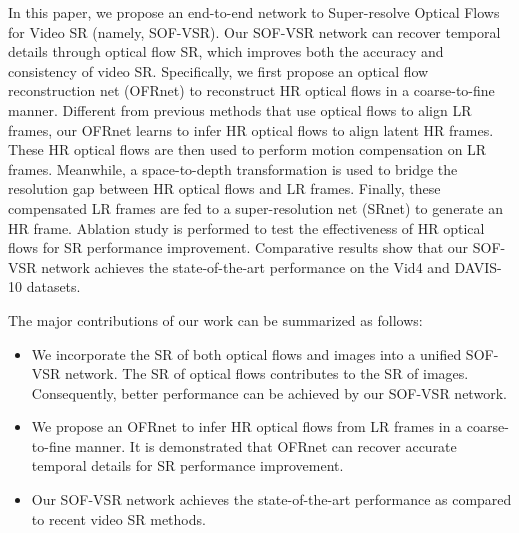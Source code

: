 \documentclass[journal]{IEEEtran}
\begin{document}
	In this paper, we propose an end-to-end network to Super-resolve Optical Flows for Video SR (namely, SOF-VSR). Our SOF-VSR network can recover temporal details through optical flow SR, which improves both the accuracy and consistency of video SR. Specifically, we first propose an optical flow reconstruction net (OFRnet) to reconstruct HR optical flows in a coarse-to-fine manner. Different from previous methods \cite{2015-VideoSuperResolutionViaDeepDraftEnsembleLearning-Liao-531-539,2017-RealTimeVideoSuperResolutionwithSpatioTemporalNetworksandMotionCompensation-Caballero-2848-2857,2017-DetailRevealingDeepVideoSuperResolution-Tao-4482-4490} that use optical flows to align LR frames, our OFRnet learns to infer HR optical flows to align latent HR frames. These HR optical flows are then used to perform motion compensation on LR frames. Meanwhile, a space-to-depth transformation is used to bridge the resolution gap between HR optical flows and LR frames.  Finally, these compensated LR frames are fed to a super-resolution net (SRnet) to generate an HR frame. Ablation study is performed to test the effectiveness of HR optical flows for SR performance improvement. Comparative results show that our SOF-VSR network achieves the state-of-the-art performance on the Vid4 and DAVIS-10 datasets.
	
	
	The major contributions of our work can be summarized as follows: 
	
	\begin{itemize}
		\item
		We incorporate the SR of both optical flows and images into a unified SOF-VSR network. The SR of optical flows contributes to the SR of images. Consequently, better performance can be achieved by our SOF-VSR network. 
		\item
		We propose an OFRnet to infer HR optical flows from LR frames in a coarse-to-fine manner. It is demonstrated that OFRnet can recover accurate temporal details for SR performance improvement.
		\item
		Our SOF-VSR network achieves the state-of-the-art performance as compared to recent video SR methods.
	\end{itemize}
	
\end{document}
